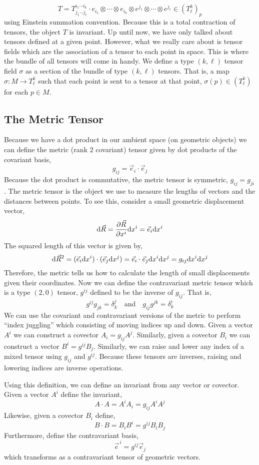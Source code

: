 \documentclass[11pt, a4paper]{article}
\begin{document}
\[ T = T^{i_1 \cdots i_k}_{j_1 \cdots j_\ell} \cdot e_{i_1} \otimes \cdots \otimes e_{i_{k}} \otimes e^{j_1} \otimes \cdots \otimes e^{j_{\ell}} \in (T^{k}_{\ell})_p\]
using Einstein summation convention. Because this is a total contraction of tensors, the object $T$ is invariant. Up until now, we have only talked about tensors defined at a given point. However, what we really care about is tensor fields which are the association of a tensor to each point in space. This is where the bundle of all tensors will come in handy. We define a type $(k, \ell)$ tensor field $\sigma$ as a section of the bundle  of type $(k, \ell)$ tensors. That is, a map $\sigma : M  \to T^k_{\ell}$ such that each point is sent to a tensor at that point, $\sigma(p) \in (T^k_{\ell})$ for each $p \in M$.

\subsection{The Metric Tensor}

Because we have a dot product in our ambient space (on geometric objects) we can define the metric (rank $2$ covariant) tensor given by dot products of the covariant basis,
\[ g_{ij} = \vec{e}_i \cdot \vec{e}_j \]
Because the dot product is commutative, the metric tensor is symmetric, $g_{ij} = g_{ji}$.
The metric tensor is the object we use to measure  the lengths of vectors and the distances between points. To see this, consider a small geometric displacement vector,
\[
\mathrm{d}\vec{R} = \frac{\partial{\vec{R}}}{\partial{x^i}} \mathrm{d}x^i = \vec{e}_i \mathrm{d}x^i
\]
The squared length of this vector is given by,
\[ \mathrm{d}\vec{R}^2 = (\vec{e}_i \mathrm{d}x^i) \cdot (\vec{e}_j \mathrm{d}x^j) = \vec{e}_i \cdot \vec{e}_j \mathrm{d}x^i \mathrm{d}x^j = g_{ij} \mathrm{d}x^i \mathrm{d}x^j \]
Therefore, the metric tells us how to calculate the length of small displacements given their coordinates. Now we can define the contravariant metric tensor which is a type $(2,0)$ tensor, $g^{ij}$ defined to be the inverse of $g_{ij}$. That is,
\[ g^{ij} g_{j k} = \delta^{j}_{k} \quad \text{and} \quad g_{ij} g^{jk} = \delta^{i}_{k}\]
We can use the covariant and contravariant versions of the metric to perform ``index juggling'' which consisting of moving indices up and down. Given a vector $A^i$ we can construct a covector $A_i = g_{ij} A^j$. Similarly, given a covector $B_i$ we can construct a vector $B^i = g^{ij} B_j$. Similarly, we can raise and lower any index of a mixed tensor using $g_{ij}$ and $g^{ij}$. Because these tensors are inverses, raising and lowering indices are inverse operations. 
\par
Using this definition, we can define an invariant from any vector or covector. Given a vector $A^i$ define the invariant,
\[A \cdot A = A^i A_i = g_{ij} A^{i} A^{j}\] Likewise, given a covector $B_i$ define,
\[ B \cdot B = B_i B^i = g^{ij} B_i B_j \] 
Furthermore, define the contravariant basis,
\[ \vec{e}^{\, i} = g^{ij} \vec{e}_j \]
which transforms as a contravariant tensor of geometric vectors.
\end{document}
